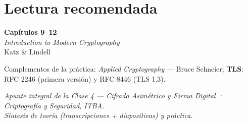 \documentclass[11pt,a4paper]{article}
\begin{document}
\section*{Lectura recomendada}
\begin{center}
\begin{tcolorbox}[enhanced,colback=itbaBlue!20,colframe=itbaCyanDark,boxrule=1pt,
  arc=3pt,width=0.85\textwidth,halign=center]
\large\textbf{Capítulos 9--12}\\[4pt]
\emph{Introduction to Modern Cryptography}\\[2pt]
Katz \& Lindell
\end{tcolorbox}
\end{center}
\noindent Complementos de la práctica: \emph{Applied Cryptography} — Bruce Schneier; \quad
\textbf{TLS}: RFC 2246 (primera versión) y RFC 8446 (TLS 1.3).

\vfill
\begin{center}\small\itshape\color{black!60}
Apunte integral de la Clase 4 — Cifrado Asimétrico y Firma Digital · Criptografía y Seguridad, ITBA.\\
Síntesis de teoría (transcripciones + diapositivas) y práctica.
\end{center}
\end{document}
